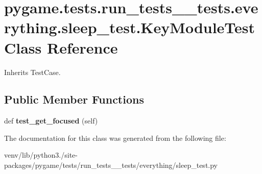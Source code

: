 \hypertarget{classpygame_1_1tests_1_1run__tests____tests_1_1everything_1_1sleep__test_1_1_key_module_test}{}\section{pygame.\+tests.\+run\+\_\+tests\+\_\+\+\_\+tests.\+everything.\+sleep\+\_\+test.\+Key\+Module\+Test Class Reference}
\label{classpygame_1_1tests_1_1run__tests____tests_1_1everything_1_1sleep__test_1_1_key_module_test}


Inherits Test\+Case.

\subsection*{Public Member Functions}
\begin{DoxyCompactItemize}
\item 
\mbox{\label{classpygame_1_1tests_1_1run__tests____tests_1_1everything_1_1sleep__test_1_1_key_module_test_aad7c8413d1e45c2751bdfcc102c279c3}} 
def {\bfseries test\+\_\+get\+\_\+focused} (self)
\end{DoxyCompactItemize}


The documentation for this class was generated from the following file\+:\begin{DoxyCompactItemize}
\item 
venv/lib/python3./site-\/packages/pygame/tests/run\+\_\+tests\+\_\+\+\_\+tests/everything/sleep\+\_\+test.\+py\end{DoxyCompactItemize}

